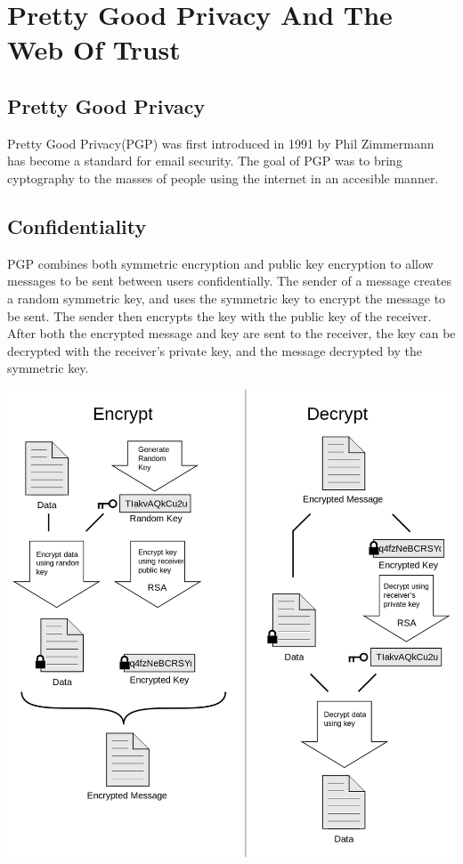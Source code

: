 \section{Pretty Good Privacy And The Web Of Trust}
\subsection{Pretty Good Privacy}
Pretty Good Privacy(PGP) was first introduced in 1991 by Phil Zimmermann has become a standard for email security. The goal of PGP was to bring cyptography to the masses of people using the internet in an accesible manner.
\subsection{Confidentiality}
PGP combines both symmetric encryption and public key encryption to allow messages to be sent between users confidentially. The sender of a message creates a random symmetric key, and uses the symmetric key to encrypt the message to be sent. The sender then encrypts the key with the public key of the receiver. After both the encrypted message and key are sent to the receiver, the key can be decrypted with the receiver's private key, and the message decrypted by the symmetric key.

\begin{center}
  \includegraphics[scale=.25]{PGP.png}
  \label{fig:Prob1:MEA}
\end{center}


